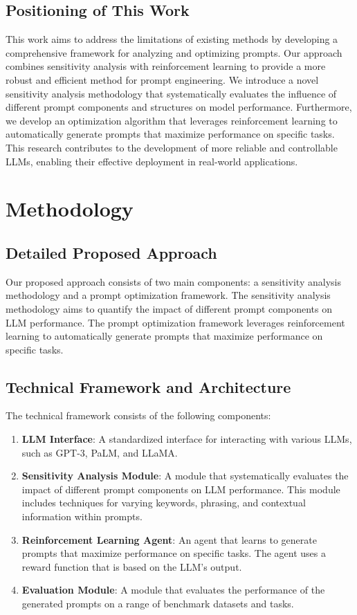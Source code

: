 \documentclass{article}
\begin{document}
\subsection{Positioning of This Work}
This work aims to address the limitations of existing methods by developing a comprehensive framework for analyzing and optimizing prompts. Our approach combines sensitivity analysis with reinforcement learning to provide a more robust and efficient method for prompt engineering. We introduce a novel sensitivity analysis methodology that systematically evaluates the influence of different prompt components and structures on model performance. Furthermore, we develop an optimization algorithm that leverages reinforcement learning to automatically generate prompts that maximize performance on specific tasks. This research contributes to the development of more reliable and controllable LLMs, enabling their effective deployment in real-world applications.

\section{Methodology}
\label{sec:methodology}

\subsection{Detailed Proposed Approach}
Our proposed approach consists of two main components: a sensitivity analysis methodology and a prompt optimization framework. The sensitivity analysis methodology aims to quantify the impact of different prompt components on LLM performance. The prompt optimization framework leverages reinforcement learning to automatically generate prompts that maximize performance on specific tasks.

\subsection{Technical Framework and Architecture}
The technical framework consists of the following components:
\begin{enumerate}
    \item \textbf{LLM Interface}: A standardized interface for interacting with various LLMs, such as GPT-3, PaLM, and LLaMA.
    \item \textbf{Sensitivity Analysis Module}: A module that systematically evaluates the impact of different prompt components on LLM performance. This module includes techniques for varying keywords, phrasing, and contextual information within prompts.
    \item \textbf{Reinforcement Learning Agent}: An agent that learns to generate prompts that maximize performance on specific tasks. The agent uses a reward function that is based on the LLM's output.
    \item \textbf{Evaluation Module}: A module that evaluates the performance of the generated prompts on a range of benchmark datasets and tasks.
\end{enumerate}
\end{document}
